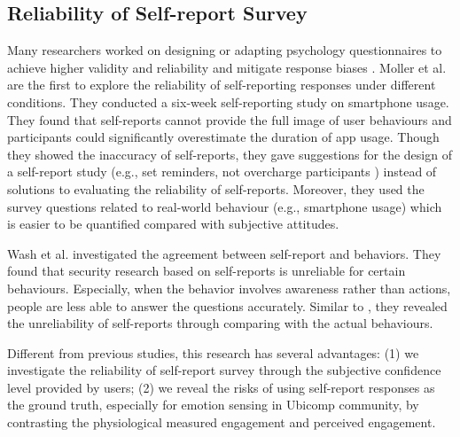 \documentclass[sigconf]{acmart}
\begin{document}
\subsection{Reliability of Self-report Survey}
Many researchers worked on designing or adapting psychology questionnaires to achieve higher validity and reliability and mitigate response biases \cite{barclay2002not,jackson2018stepovers,sonderen2013ineffectiveness}. 
Moller et al. \cite{moller2013investigating} are the first to explore the reliability of self-reporting responses under different conditions. They conducted a six-week self-reporting study on smartphone usage. They found that self-reports cannot provide the full image of user behaviours and participants could significantly overestimate the duration of app usage. Though they showed the inaccuracy of self-reports, they gave suggestions for the design of a self-report study (e.g., set reminders, not overcharge participants ) instead of solutions to evaluating the reliability of self-reports. Moreover, they used the survey questions related to real-world behaviour (e.g., smartphone usage) which is easier to be quantified compared with subjective attitudes. 

Wash et al. \cite{wash2017can} investigated the agreement between self-report and behaviors. They found that security research based on self-reports is unreliable for certain behaviours. Especially, when the behavior involves awareness rather than actions, people are less able to answer the questions accurately. Similar to \cite{moller2013investigating}, they revealed the unreliability of self-reports through comparing with the actual behaviours.  

Different from previous studies, this research has several advantages: (1) we investigate the reliability of self-report survey through the subjective confidence level provided by users; (2) we reveal the risks of using self-report responses as the ground truth, especially for emotion sensing in Ubicomp community, by contrasting the physiological measured engagement and perceived engagement.   


\end{document}

